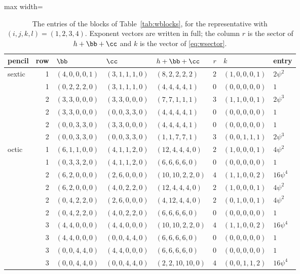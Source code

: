 \begin{table}[t]
\caption{The entries of the blocks of Table~\ref{tab:wblocks}, for the
representative with $(i,j,k,l)=(1,2,3,4)$. Exponent vectors are written in
full; the column $r$ is the sector of $h+\bb+\cc$ and $k$ is the vector of
\eqref{eq:wsector}.}
\label{tab:wblockdata}
\centering
\footnotesize
\begin{adjustbox}{max width=\linewidth}\begin{tabular}{lrlllrll}
\toprule
pencil & row & $\bb$ & $\cc$ & $h+\bb+\cc$ & $r$ & $k$ & entry\\
\midrule
sextic & 1 & $(4,0,0,0,1)$ & $(3,1,1,1,0)$ & $(8,2,2,2,2)$ & $2$ & $(1,0,0,0,1)$ & $2\psi^{2}$\\
 & 1 & $(0,2,2,2,0)$ & $(3,1,1,1,0)$ & $(4,4,4,4,1)$ & $0$ & $(0,0,0,0,0)$ & $1$\\
 & 2 & $(3,3,0,0,0)$ & $(3,3,0,0,0)$ & $(7,7,1,1,1)$ & $3$ & $(1,1,0,0,1)$ & $2\psi^{3}$\\
 & 2 & $(3,3,0,0,0)$ & $(0,0,3,3,0)$ & $(4,4,4,4,1)$ & $0$ & $(0,0,0,0,0)$ & $1$\\
 & 2 & $(0,0,3,3,0)$ & $(3,3,0,0,0)$ & $(4,4,4,4,1)$ & $0$ & $(0,0,0,0,0)$ & $1$\\
 & 2 & $(0,0,3,3,0)$ & $(0,0,3,3,0)$ & $(1,1,7,7,1)$ & $3$ & $(0,0,1,1,1)$ & $2\psi^{3}$\\
\midrule
octic & 1 & $(6,1,1,0,0)$ & $(4,1,1,2,0)$ & $(12,4,4,4,0)$ & $2$ & $(1,0,0,0,1)$ & $4\psi^{2}$\\
 & 1 & $(0,3,3,2,0)$ & $(4,1,1,2,0)$ & $(6,6,6,6,0)$ & $0$ & $(0,0,0,0,0)$ & $1$\\
 & 2 & $(6,2,0,0,0)$ & $(2,6,0,0,0)$ & $(10,10,2,2,0)$ & $4$ & $(1,1,0,0,2)$ & $16\psi^{4}$\\
 & 2 & $(6,2,0,0,0)$ & $(4,0,2,2,0)$ & $(12,4,4,4,0)$ & $2$ & $(1,0,0,0,1)$ & $4\psi^{2}$\\
 & 2 & $(0,4,2,2,0)$ & $(2,6,0,0,0)$ & $(4,12,4,4,0)$ & $2$ & $(0,1,0,0,1)$ & $4\psi^{2}$\\
 & 2 & $(0,4,2,2,0)$ & $(4,0,2,2,0)$ & $(6,6,6,6,0)$ & $0$ & $(0,0,0,0,0)$ & $1$\\
 & 3 & $(4,4,0,0,0)$ & $(4,4,0,0,0)$ & $(10,10,2,2,0)$ & $4$ & $(1,1,0,0,2)$ & $16\psi^{4}$\\
 & 3 & $(4,4,0,0,0)$ & $(0,0,4,4,0)$ & $(6,6,6,6,0)$ & $0$ & $(0,0,0,0,0)$ & $1$\\
 & 3 & $(0,0,4,4,0)$ & $(4,4,0,0,0)$ & $(6,6,6,6,0)$ & $0$ & $(0,0,0,0,0)$ & $1$\\
 & 3 & $(0,0,4,4,0)$ & $(0,0,4,4,0)$ & $(2,2,10,10,0)$ & $4$ & $(0,0,1,1,2)$ & $16\psi^{4}$\\

\end{tabular}
\end{adjustbox}
\end{table}
